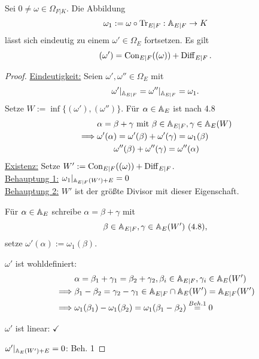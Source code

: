 \begin{satz}
    Sei $0 \ne \omega \in \Omega_{F|K}$. Die Abbildung 
    $$\omega_1:= \omega \circ \operatorname{Tr}_{E|F}: \mathbb{A}_{E|F} \to K$$
    lässt sich eindeutig zu einem $\omega' \in \Omega_E$ fortsetzen.
    Es gilt
    $$ (\omega') = \operatorname{Con}_{E|F}((\omega)) + \operatorname{Diff}_{E|F}. $$
\end{satz}
\begin{proof}
    \underline{Eindeutigkeit:} Seien $\omega', \omega'' \in \Omega_E$ mit 
    \begin{align*}
        \omega'|_{\mathbb{A}_{E|F}} = \omega''|_{\mathbb{A}_{E|F}} = \omega_1.
    \end{align*}
    Setze $W:= \inf \{(\omega'), (\omega'')\}$.
    Für $\alpha \in \mathbb{A}_E$ ist nach 4.8
    \begin{align*}
        & \alpha = \beta + \gamma \text{ mit } \beta \in \mathbb{A}_{E|F}, \gamma \in \mathbb{A}_E(W)\\
        \implies & \omega'(\alpha) = \omega'(\beta) + \omega'(\gamma) = \omega_1(\beta)\\
        & \qquad \omega''(\beta) + \omega''(\gamma) = \omega''(\alpha)
    \end{align*}
    \underline{Existenz:} Setze $W':=\operatorname{Con}_{E|F}((\omega)) + \operatorname{Diff}_{E|F}$.\\
    \underline{Behauptung 1:} $\omega_1|_{\mathbb{A}_{E|F}(W')+E} = 0$\\
    \underline{Behauptung 2:} $W'$ ist der größte Divisor mit dieser Eigenschaft.

    Für $\alpha \in \mathbb{A}_E$ schreibe $\alpha = \beta + \gamma$ mit
    $$ \beta \in \mathbb{A}_{E|F}, \gamma \in \mathbb{A}_E(W')~(4.8),$$
    setze $\omega'(\alpha) := \omega_1(\beta)$.
    
    $\omega'$ ist wohldefiniert:
    \begin{align*}
        & \alpha = \beta_1 + \gamma_1 = \beta_2 + \gamma_2, \beta_i \in \mathbb{A}_{E|F}, \gamma_i \in \mathbb{A}_E(W')\\
        \implies & \beta_1 - \beta_2 = \gamma_2 - \gamma_1 \in \mathbb{A}_{E|F}\cap\mathbb{A}_E(W')=\mathbb{A}_{E|F}(W')\\
        \implies & \omega_1(\beta_1) - \omega_1(\beta_2) = \omega_1(\beta_1 - \beta_2) \stackrel{Beh. 1}{=} 0
    \end{align*}

    $\omega'$ ist linear: $\checkmark$

    $\omega'|_{\mathbb{A}_E(W')+E} = 0$: Beh. 1


\end{proof}
